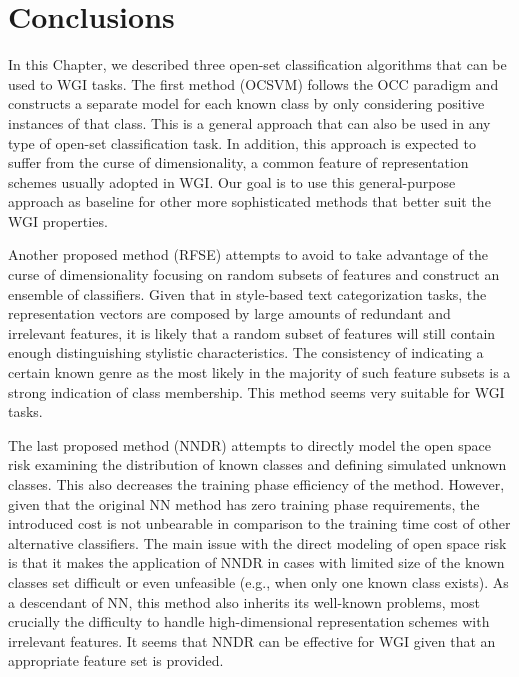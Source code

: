 \section{Conclusions}\label{chap:openset:sec:NNRD_Description}

In this Chapter, we described three open-set classification algorithms that can be used to WGI tasks. The first method (OCSVM) follows the OCC paradigm and constructs a separate model for each known class by only considering positive instances of that class. This is a general approach that can also be used in any type of open-set classification task. In addition, this approach is expected to suffer from the curse of dimensionality, a common feature of representation schemes usually adopted in WGI. Our goal is to use this general-purpose approach as baseline for other more sophisticated methods that better suit the WGI properties.

Another proposed method (RFSE) attempts to avoid to take advantage of the curse of dimensionality focusing on random subsets of features and construct an ensemble of classifiers. Given that in style-based text categorization tasks, the representation vectors are composed by large amounts of redundant and irrelevant features, it is likely that a random subset of features will still contain enough distinguishing stylistic characteristics. The consistency of indicating a certain known genre as the most likely in the majority of such feature subsets is a strong indication of class membership. This method seems very suitable for WGI tasks. 

The last proposed method (NNDR) attempts to directly model the open space risk examining the distribution of known classes and defining simulated unknown classes. This also decreases the training phase efficiency of the method. However, given that the original NN method has zero training phase requirements, the introduced cost is not unbearable in comparison to the training time cost of other alternative classifiers. The main issue with the direct modeling of open space risk is that it makes the application of NNDR in cases with limited size of the known classes set difficult or even unfeasible (e.g., when only one known class exists). As a descendant of NN, this method also inherits its well-known problems, most crucially the difficulty to handle high-dimensional representation schemes with irrelevant features. It seems that NNDR can be effective for WGI given that an appropriate feature set is provided.